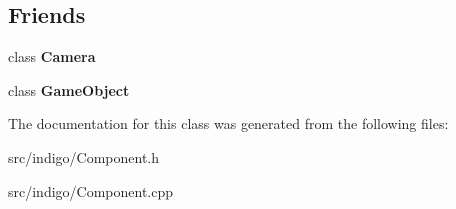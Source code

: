 \subsection*{Friends}
\begin{DoxyCompactItemize}
\item 
\mbox{\label{class_indigo_1_1_component_ad8bd9afbbd7af19d996da80e9d25890d}} 
class {\bfseries Camera}
\item 
\mbox{\label{class_indigo_1_1_component_a00df87c957d8f7ee0fc51f07a0542f4a}} 
class {\bfseries Game\+Object}
\end{DoxyCompactItemize}


The documentation for this class was generated from the following files\+:\begin{DoxyCompactItemize}
\item 
src/indigo/Component.\+h\item 
src/indigo/Component.\+cpp\end{DoxyCompactItemize}

